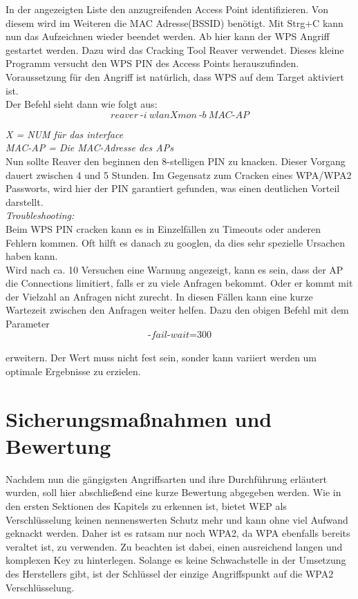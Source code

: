 In der angezeigten Liste den anzugreifenden Access Point identifizieren. Von diesem wird im Weiteren die MAC Adresse(BSSID) benötigt.
Mit Strg+C kann nun das Aufzeichnen wieder beendet werden. Ab hier kann der WPS Angriff gestartet werden. Dazu wird das Cracking Tool Reaver verwendet. Dieses kleine Programm versucht den WPS PIN des Access Points herauszufinden. Voraussetzung für den Angriff ist natürlich, dass WPS auf dem Target aktiviert ist. \\

Der Befehl sieht dann wie folgt aus:\\


$$reaver~\text{-}i~wlanXmon~\text{-}b~MAC\text{-}AP$$

\textit{X = NUM für das interface}\\ 
\textit{MAC-AP = Die MAC-Adresse des APs}\\ 

Nun sollte Reaver den beginnen den 8-stelligen PIN zu knacken. Dieser Vorgang dauert zwischen 4 und 5 Stunden. Im Gegensatz zum Cracken eines WPA/WPA2 Passworts, wird hier der PIN garantiert gefunden, was einen deutlichen Vorteil darstellt. \\

\textit{Troubleshooting:}\\

Beim WPS PIN cracken kann es in Einzelfällen zu Timeouts oder anderen Fehlern kommen. Oft hilft es danach zu googlen, da dies sehr spezielle Ursachen haben kann. \\

Wird nach ca. 10 Versuchen eine Warnung angezeigt, kann es sein, dass der AP die Connections limitiert, falls er zu viele Anfragen bekommt. Oder er kommt mit der Vielzahl an Anfragen nicht zurecht. In diesen Fällen kann eine kurze Wartezeit zwischen den Anfragen weiter helfen. Dazu den obigen Befehl mit dem Parameter\\

$$\text{-}fail\text{-}wait\text{=}300$$\\

erweitern. Der Wert muss nicht fest sein, sonder kann variiert werden um optimale Ergebnisse zu erzielen. 



\section{Sicherungsmaßnahmen und Bewertung}

Nachdem nun die gängigsten Angriffsarten und ihre Durchführung erläutert wurden, soll hier abschließend eine kurze Bewertung abgegeben werden. Wie in den ersten Sektionen des Kapitels zu erkennen ist, bietet WEP als Verschlüsselung keinen nennenswerten Schutz mehr und kann ohne viel Aufwand geknackt werden. Daher ist es ratsam nur noch WPA2, da WPA ebenfalls bereits veraltet ist, zu verwenden. Zu beachten ist dabei, einen ausreichend langen und komplexen Key zu hinterlegen. Solange es keine Schwachstelle in der Umsetzung des Herstellers gibt, ist der Schlüssel der einzige Angriffspunkt auf die WPA2 Verschlüsselung. \\

